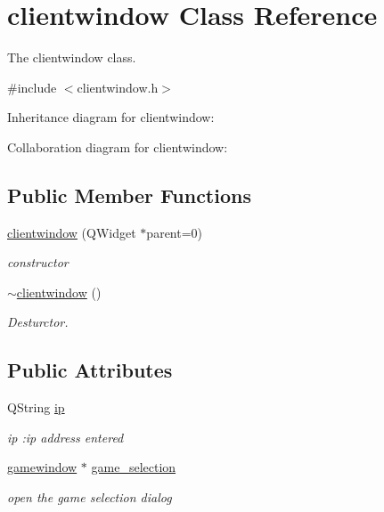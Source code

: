 \hypertarget{classclientwindow}{}\section{clientwindow Class Reference}
\label{classclientwindow}


The clientwindow class.  




{\ttfamily \#include $<$clientwindow.\+h$>$}



Inheritance diagram for clientwindow\+:


Collaboration diagram for clientwindow\+:
\subsection*{Public Member Functions}
\begin{DoxyCompactItemize}
\item 
\hyperlink{classclientwindow_a9ea65c58093430993fc64bedab0ee6e3}{clientwindow} (Q\+Widget $\ast$parent=0)
\begin{DoxyCompactList}\small\item\em constructor \end{DoxyCompactList}\item 
\hyperlink{classclientwindow_a53333bf0d133c70836f94ba20242fd36}{$\sim$clientwindow} ()\hypertarget{classclientwindow_a53333bf0d133c70836f94ba20242fd36}{}\label{classclientwindow_a53333bf0d133c70836f94ba20242fd36}

\begin{DoxyCompactList}\small\item\em Desturctor. \end{DoxyCompactList}\end{DoxyCompactItemize}
\subsection*{Public Attributes}
\begin{DoxyCompactItemize}
\item 
Q\+String \hyperlink{classclientwindow_a9ab2cf273ff4597f60b82a701be2188c}{ip}\hypertarget{classclientwindow_a9ab2cf273ff4597f60b82a701be2188c}{}\label{classclientwindow_a9ab2cf273ff4597f60b82a701be2188c}

\begin{DoxyCompactList}\small\item\em ip \+:ip address entered \end{DoxyCompactList}\item 
\hyperlink{classgamewindow}{gamewindow} $\ast$ \hyperlink{classclientwindow_a3ff825fc73bea1af59252862f21014ab}{game\+\_\+selection}\hypertarget{classclientwindow_a3ff825fc73bea1af59252862f21014ab}{}\label{classclientwindow_a3ff825fc73bea1af59252862f21014ab}

\begin{DoxyCompactList}\small\item\em open the game selection dialog \end{DoxyCompactList}\end{DoxyCompactItemize}


